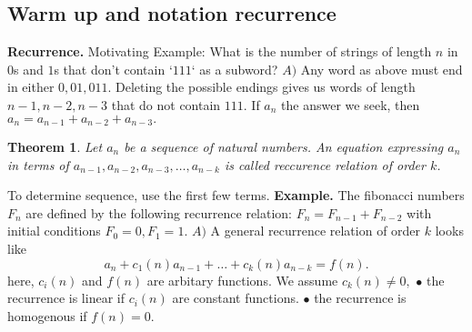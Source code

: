 \documentclass{article}
\newtheorem{theorem}{Theorem}                                       %
\begin{document}
\subsection{Warm up and notation recurrence}
\textbf{Recurrence. } Motivating Example:
\newline
\newline
What is the number of strings of length $n$ in $0$s and $1$s that don't contain `$111$` as a subword?
\newline
$A) $ Any word as above must end in either $0, 01, 011$. Deleting the possible endings gives us words of length $n - 1, n - 2, n - 3$ that do not contain $111$. If $a_n$ the answer we seek, 
then $a_n = a_{n - 1} + a_{n - 2} + a_{n - 3}.$
\newline
\newline
\begin{theorem}
  Let $a_n$ be a sequence of natural numbers. An equation expressing $a_n$ in terms of $a_{n - 1}, a_{n - 2}, a_{n - 3}, \dots, a_{n - k}$
  is called reccurence relation of order $k$.
\end{theorem}
To determine sequence, use the first few terms. 
\newline
\newline
\textbf{Example. } The fibonacci numbers $F_n$ are defined by the following recurrence
relation: $F_n = F_{n - 1} + F_{n - 2}$ with initial conditions $F_0 = 0, F_1 = 1.$
\newline
\newline
$A) $ A general recurrence relation of order $k$ looks like 
$$a_n + c_1(n)a_{n - 1} + \dots + c_k(n)a_{n - k} = f(n).$$
here, $c_i(n)$ and $f(n)$ are arbitary functions. We assume $c_k(n) \not = 0,$
\newline
$\bullet $ the recurrence is linear if $c_i(n)$ are constant functions. 
\newline
$\bullet $ the recurrence is homogenous if $f(n) = 0.$
\newpage
\end{document}
